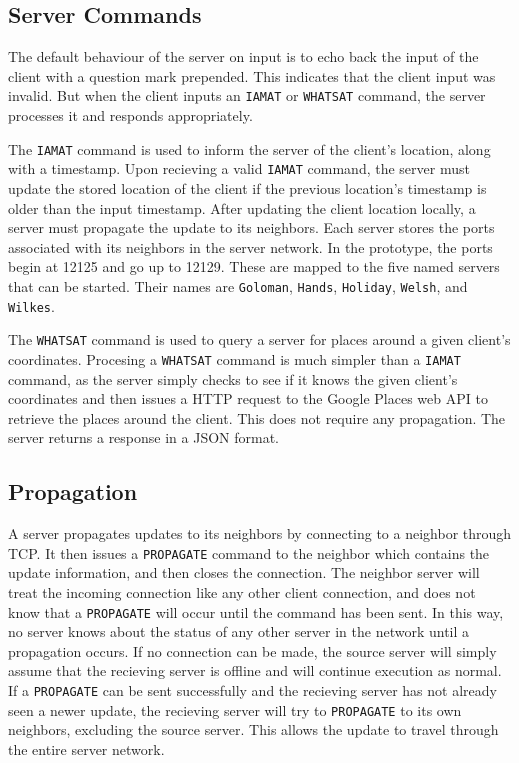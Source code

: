 \documentclass[letterpaper,twocolumn,10pt]{article}
\begin{document}
\subsection{Server Commands}

The default behaviour of the server on input is to echo back the input of the client with a question mark prepended.
This indicates that the client input was invalid. But when the client inputs an \texttt{IAMAT} or \texttt{WHATSAT} command,
the server processes it and responds appropriately.

The \texttt{IAMAT} command is used to inform the server of the client's location, along with a timestamp. Upon recieving
a valid \texttt{IAMAT} command, the server must update the stored location of the client if the previous location's timestamp
is older than the input timestamp. After updating the client location locally, a server must propagate the update to its
neighbors. Each server stores the ports associated with its neighbors in the server network. In the prototype, the ports begin
at 12125 and go up to 12129. These are mapped to the five named servers that can be started. Their names are \texttt{Goloman},
\texttt{Hands}, \texttt{Holiday}, \texttt{Welsh}, and \texttt{Wilkes}.

The \texttt{WHATSAT} command is used to query a server for places around a given client's coordinates. Procesing a \texttt{WHATSAT}
command is much simpler than a \texttt{IAMAT} command, as the server simply checks to see if it knows the given client's coordinates and
then issues a HTTP request to the Google Places web API to retrieve the places around the client. This does not require any propagation.
The server returns a response in a JSON format.

\subsection{Propagation}

A server propagates updates to its neighbors by connecting to a neighbor through TCP. It then issues a \texttt{PROPAGATE}
command to the neighbor which contains the update information, and then closes the connection. The neighbor server will treat
the incoming connection like any other client connection, and does not know that a \texttt{PROPAGATE} will occur until the
command has been sent. In this way, no server knows about the status of any other server in the network until a propagation
occurs. If no connection can be made, the source server will simply assume that the recieving server is offline and will continue
execution as normal. If a \texttt{PROPAGATE} can be sent successfully and the recieving server has not already seen a newer update,
the recieving server will try to \texttt{PROPAGATE} to its own neighbors, excluding the source server. This allows the update to travel
through the entire server network.
\end{document}
